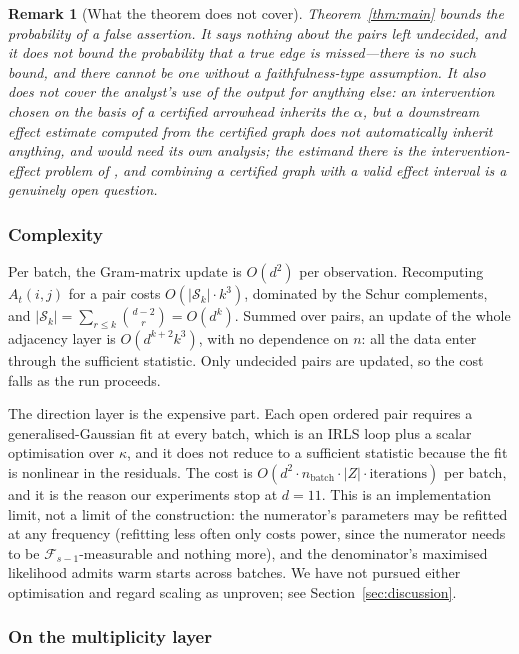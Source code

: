 \documentclass[pdflatex,sn-apa]{sn-jnl}
\theoremstyle{thmstyleone}%
\theoremstyle{thmstyletwo}%
\newtheorem{remark}{Remark}%
\theoremstyle{thmstylethree}%
\newcommand{\Fcal}{\mathcal{F}}
\newcommand{\Scal}{\mathcal{S}}
\begin{document}
\begin{remark}[What the theorem does not cover]
Theorem~\ref{thm:main} bounds the probability of a false \emph{assertion}. It
says nothing about the pairs left undecided, and it does not bound the
probability that a true edge is missed---there is no such bound, and there
cannot be one without a faithfulness-type assumption. It also does not cover
the analyst's use of the output for anything else: an intervention chosen on
the basis of a certified arrowhead inherits the $\alpha$, but a downstream
effect estimate computed from the certified graph does not automatically
inherit anything, and would need its own analysis; the estimand there is the intervention-effect
problem of \citet{maathuis2009estimating}, and combining a certified graph
with a valid effect interval is a genuinely open question.
\end{remark}

\subsubsection{Complexity}\label{sec:complexity}

Per batch, the Gram-matrix update is $O(d^2)$ per observation. Recomputing
$A_t(i,j)$ for a pair costs $O(|\Scal_k| \cdot k^3)$, dominated by the Schur
complements, and $|\Scal_k| = \sum_{r \le k}\binom{d-2}{r} = O(d^k)$. Summed
over pairs, an update of the whole adjacency layer is $O(d^{k+2} k^3)$, with
no dependence on $n$: all the data enter through the sufficient statistic.
Only undecided pairs are updated, so the cost falls as the run proceeds.

The direction layer is the expensive part. Each open ordered pair requires a
generalised-Gaussian fit at every batch, which is an IRLS loop plus a scalar
optimisation over $\kappa$, and it does not reduce to a sufficient statistic
because the fit is nonlinear in the residuals. The cost is $O(d^2 \cdot
n_{\text{batch}} \cdot |Z| \cdot \text{iterations})$ per batch, and it is the
reason our experiments stop at $d = 11$. This is an implementation limit, not
a limit of the construction: the numerator's parameters may be refitted at any
frequency (refitting less often only costs power, since the numerator needs to
be $\Fcal_{s-1}$-measurable and nothing more), and the denominator's maximised
likelihood admits warm starts across batches. We have not pursued either
optimisation and regard scaling as unproven; see Section~\ref{sec:discussion}.

\subsubsection{On the multiplicity layer}\label{sec:multiplicity}
\end{document}
